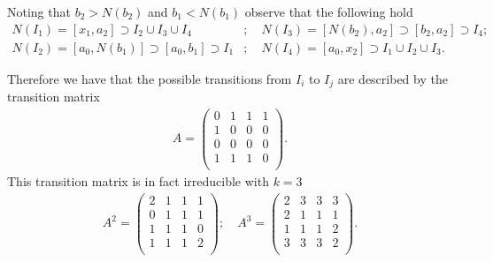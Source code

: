 \begin{ex}
Noting that $b_2 > N(b_2)$ and $b_1 < N(b_1)$ observe that the following hold
\begin{subequations}
\begin{align}
	N(I_1) = [x_1, a_2] \supset I_2 \cup I_3 \cup I_4&; \quad	
	N(I_3) = [N(b_2), a_2] \supset [b_2, a_2] \supset I_4;\\
	N(I_2) = [a_0, N(b_1)] \supset [a_0, b_1] \supset I_1&;\quad
	N(I_4) = [a_0, x_2] \supset I_1 \cup I_2 \cup I_3.
\end{align}
\end{subequations}
\end{ex}
Therefore we have that the possible transitions from $I_{i}$ to $I_{j}$ are described by the transition matrix
\begin{align}
	A = 
	\begin{pmatrix}
		0 & 1 & 1 & 1 \\
		1 & 0 & 0 & 0 \\
		0 & 0 & 0 & 0 \\
		1 & 1 & 1 & 0 \\
	\end{pmatrix}
.	
\end{align}
This transition matrix is in fact irreducible with $k=3$
\begin{align}
	A^2 = 
	\begin{pmatrix}
		2 & 1 & 1 & 1 \\
		0 & 1 & 1 & 1 \\
		1 & 1 & 1 & 0 \\
		1 & 1 & 1 & 2 \\
	\end{pmatrix}
;\quad	
	A^3 = 
	\begin{pmatrix}
		2 & 3 & 3 & 3 \\
		2 & 1 & 1 & 1 \\
		1 & 1 & 1 & 2 \\
		3 & 3 & 3 & 2 \\
	\end{pmatrix}
	.
\end{align}

